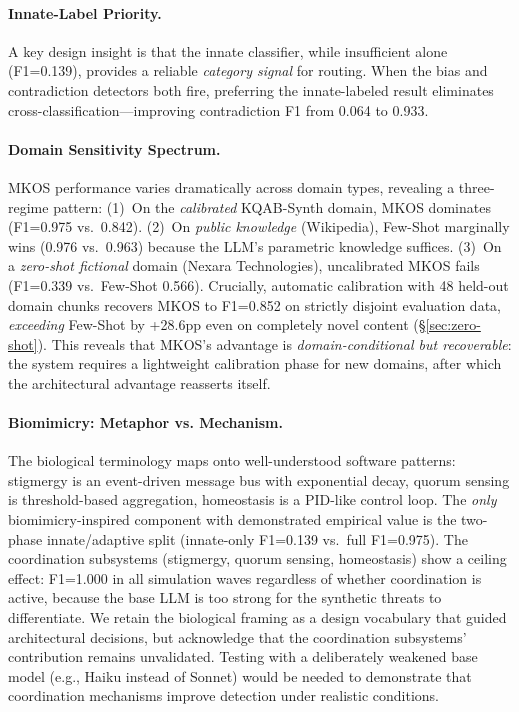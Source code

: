 \documentclass[11pt]{article}
\begin{document}
\paragraph{Innate-Label Priority.} A key design insight is that the innate classifier, while insufficient alone (F1=0.139), provides a reliable \emph{category signal} for routing. When the bias and contradiction detectors both fire, preferring the innate-labeled result eliminates cross-classification---improving contradiction F1 from 0.064 to 0.933.

\paragraph{Domain Sensitivity Spectrum.} MKOS performance varies dramatically across domain types, revealing a three-regime pattern: (1)~On the \emph{calibrated} KQAB-Synth domain, MKOS dominates (F1=0.975 vs.\ 0.842). (2)~On \emph{public knowledge} (Wikipedia), Few-Shot marginally wins (0.976 vs.\ 0.963) because the LLM's parametric knowledge suffices. (3)~On a \emph{zero-shot fictional} domain (Nexara Technologies), uncalibrated MKOS fails (F1=0.339 vs.\ Few-Shot 0.566). Crucially, automatic calibration with 48 held-out domain chunks recovers MKOS to F1=0.852 on strictly disjoint evaluation data, \emph{exceeding} Few-Shot by +28.6pp even on completely novel content (\S\ref{sec:zero-shot}). This reveals that MKOS's advantage is \emph{domain-conditional but recoverable}: the system requires a lightweight calibration phase for new domains, after which the architectural advantage reasserts itself.

\paragraph{Biomimicry: Metaphor vs. Mechanism.} The biological terminology maps onto well-understood software patterns: stigmergy is an event-driven message bus with exponential decay, quorum sensing is threshold-based aggregation, homeostasis is a PID-like control loop. The \emph{only} biomimicry-inspired component with demonstrated empirical value is the two-phase innate/adaptive split (innate-only F1=0.139 vs.\ full F1=0.975). The coordination subsystems (stigmergy, quorum sensing, homeostasis) show a ceiling effect: F1=1.000 in all simulation waves regardless of whether coordination is active, because the base LLM is too strong for the synthetic threats to differentiate. We retain the biological framing as a design vocabulary that guided architectural decisions, but acknowledge that the coordination subsystems' contribution remains unvalidated. Testing with a deliberately weakened base model (e.g., Haiku instead of Sonnet) would be needed to demonstrate that coordination mechanisms improve detection under realistic conditions.
\end{document}
